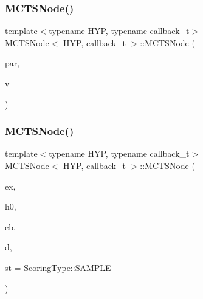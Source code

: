 \subsubsection{\texorpdfstring{M\+C\+T\+S\+Node()}{MCTSNode()}\hspace{0.1cm}{\footnotesize\ttfamily [1/4]}}
{\footnotesize\ttfamily template$<$typename H\+YP, typename callback\+\_\+t$>$ \\
\hyperlink{class_m_c_t_s_node}{M\+C\+T\+S\+Node}$<$ H\+YP, callback\+\_\+t $>$\+::\hyperlink{class_m_c_t_s_node}{M\+C\+T\+S\+Node} (\begin{DoxyParamCaption}\item[{\hyperlink{class_m_c_t_s_node}{M\+C\+T\+S\+Node}$<$ H\+YP, callback\+\_\+t $>$ $\ast$}]{par,  }\item[{H\+YP \&}]{v }\end{DoxyParamCaption})\hspace{0.3cm}{\ttfamily [inline]}}

\mbox{\label{class_m_c_t_s_node_aeb45ef5d519e94298c4a6f6169287b15}} 
\subsubsection{\texorpdfstring{M\+C\+T\+S\+Node()}{MCTSNode()}\hspace{0.1cm}{\footnotesize\ttfamily [2/4]}}
{\footnotesize\ttfamily template$<$typename H\+YP, typename callback\+\_\+t$>$ \\
\hyperlink{class_m_c_t_s_node}{M\+C\+T\+S\+Node}$<$ H\+YP, callback\+\_\+t $>$\+::\hyperlink{class_m_c_t_s_node}{M\+C\+T\+S\+Node} (\begin{DoxyParamCaption}\item[{double}]{ex,  }\item[{H\+YP \&}]{h0,  }\item[{callback\+\_\+t $\ast$}]{cb,  }\item[{typename H\+Y\+P\+::t\+\_\+data $\ast$}]{d,  }\item[{\hyperlink{class_m_c_t_s_node_a5a201dc80c97c1b65503161f7e5603f6}{Scoring\+Type}}]{st = {\ttfamily \hyperlink{class_m_c_t_s_node_a5a201dc80c97c1b65503161f7e5603f6af5a2496cf66cb8cffe66cb1b27d7dede}{Scoring\+Type\+::\+S\+A\+M\+P\+LE}} }\end{DoxyParamCaption})\hspace{0.3cm}{\ttfamily [inline]}}

